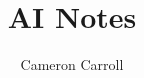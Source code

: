 \usepackage{titlesec}
\usepackage{setspace}
\usepackage{csquotes}
\usepackage[american]{babel}




\title{AI Notes}
\author{Cameron Carroll}
\maketitle


\section*{}




